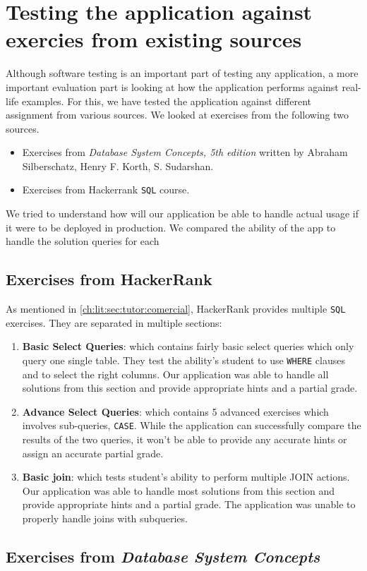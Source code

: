 \section{Testing the application against exercies from existing sources}
Although software testing is an important part of testing any application, a more important evaluation part is looking at how the application performs against real-life examples. For this, we have tested the application against different assignment from various sources. We looked at exercises from the following two sources.

\begin{itemize}
    \item Exercises from \textit{Database System Concepts, 5th edition} written by Abraham Silberschatz, Henry F. Korth, S. Sudarshan.
    \item Exercises from Hackerrank \texttt{SQL} course.
\end{itemize}

We tried to understand how will our application be able to handle actual usage if it were to be deployed in production. We compared the ability of the app to handle the solution queries for each 

\subsection{Exercises from HackerRank}

As mentioned in \ref{ch:lit:sec:tutor:comercial}, HackerRank provides multiple \texttt{SQL} exercises. They are separated in multiple sections:

\begin{enumerate}
    \item \textbf{Basic Select Queries}: which contains fairly basic select queries which only query one single table. They test the ability's student to use \texttt{WHERE} clauses and to select the right columns. Our application was able to handle all solutions from this section and provide appropriate hints and a partial grade.
    \item \textbf{Advance Select Queries}: which contains 5 advanced exercises which involves sub-queries, \texttt{CASE}. While the application can successfully compare the results of the two queries, it won't be able to provide any accurate hints or assign an accurate partial grade.
    \item \textbf{Basic join}: which tests student's ability to perform multiple JOIN actions. Our application was able to handle most solutions from this section and provide appropriate hints and a partial grade. The application was unable to properly handle joins with subqueries.
\end{enumerate}

\subsection{Exercises from \textit{Database System Concepts}}

